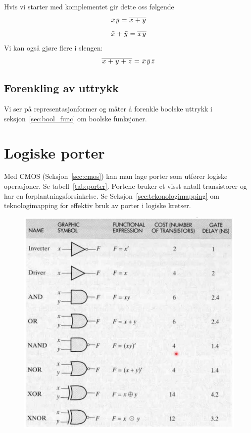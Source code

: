\documentclass[12pt,a4paper,norsk]{article}
\begin{document}
Hvis vi starter med komplementet gir dette oss følgende
\[\kom{x}\kom{y} = \overline{\var{x}+\var{y}}\]
\[\kom{x} + \kom{y} = \overline{\var{x}\var{y}}\]
Vi kan også gjøre flere i slengen:
\[\overline{\var{x} + \var{y} + \var{z}} = \kom{x}\kom{y}\kom{z}\]

\subsection{Forenkling av uttrykk}
Vi ser på representasjonformer og måter å forenkle boolske uttrykk i
seksjon~\ref{sec:bool_func} om boolske funksjoner.

\section{Logiske porter}\label{sec:logiske_porter}
Med CMOS (Seksjon~\ref{sec:cmos}) kan man lage porter som utfører logiske
operasjoner. Se tabell~\ref{tab:porter}. Portene bruker et visst antall
transistorer og har en forplantningsforsinkelse. Se
Seksjon~\ref{sec:tekonologimapping} om teknologimapping for effektiv bruk av
porter i logiske kretser.

\begin{figure}[hbt!]
  \centering
  \includegraphics[width=\textwidth,height=\textheight,keepaspectratio]{Krets_Gates}
\end{figure}
\end{document}
